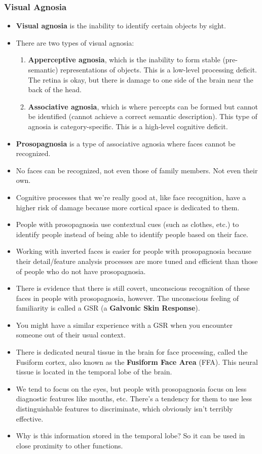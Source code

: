 \documentclass[]{article}
\begin{document}
			\subsubsection{Visual Agnosia}
				\begin{itemize}
					\item \textbf{Visual agnosia} is the inability to identify certain objects by sight.
					\item There are two types of visual agnosia:
						\begin{enumerate}
							\item \textbf{Apperceptive agnosia}, which is the inability to form stable (pre-semantic) representations of objects. This is a low-level processing deficit. The retina is okay, but there is damage to one side of the brain near the back of the head.
							\item \textbf{Associative agnosia}, which is where percepts can be formed but cannot be identified (cannot achieve a correct semantic description). This type of agnosia is category-specific. This is a high-level cognitive deficit.
						\end{enumerate}
					\item \textbf{Prosopagnosia} is a type of associative agnosia where faces cannot be recognized.
					\item No faces can be recognized, not even those of family members. Not even their own.
					\item Cognitive processes that we're really good at, like face recognition, have a higher risk of damage because more cortical space is dedicated to them.
					\item People with prosopagnosia use contextual cues (such as clothes, etc.) to identify people instead of being able to identify people based on their face.
					\item Working with inverted faces is easier for people with prosopagnosia because their detail/feature analysis processes are more tuned and efficient than those of people who do not have prosopagnosia.
					\item There is evidence that there is still covert, unconscious recognition of these faces in people with prosopagnosia, however. The unconscious feeling of familiarity is called a GSR (a \textbf{Galvonic Skin Response}).
					\item You might have a similar experience with a GSR when you encounter someone out of their usual context.
					\item There is dedicated neural tissue in the brain for face processing, called the Fusiform cortex, also known as the \textbf{Fusiform Face Area} (FFA). This neural tissue is located in the temporal lobe of the brain.
					\item We tend to focus on the eyes, but people with prosopagnosia focus on less diagnostic features like mouths, etc. There's a tendency for them to use less distinguishable features to discriminate, which obviously isn't terribly effective.
					\item Why is this information stored in the temporal lobe? So it can be used in close proximity to other functions.
				\end{itemize}
\end{document}
